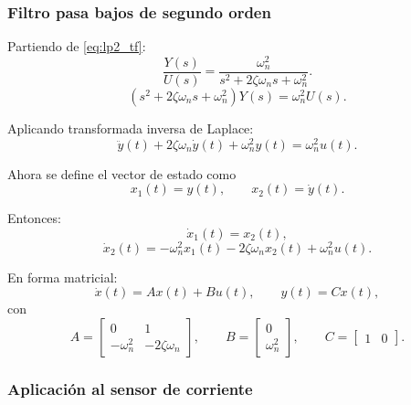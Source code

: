 \documentclass[12pt, a4paper,journal, onecolumn, compsoc]{IEEEtran}
\begin{document}
\subsubsection*{Filtro pasa bajos de segundo orden}

Partiendo de \eqref{eq:lp2_tf}:
\begin{equation}
    \frac{Y(s)}{U(s)}=\frac{\omega_n^2}{s^2+2\zeta\omega_n s+\omega_n^2}.
\end{equation}
\begin{equation}
    (s^2+2\zeta\omega_n s+\omega_n^2)Y(s)=\omega_n^2 U(s).
\end{equation}

Aplicando transformada inversa de Laplace:
\begin{equation}
    \ddot{y}(t)+2\zeta\omega_n \dot{y}(t)+\omega_n^2 y(t)=\omega_n^2 u(t).
\end{equation}

Ahora se define el vector de estado como
\begin{equation}
    x_1(t)=y(t), \qquad x_2(t)=\dot{y}(t).
\end{equation}

Entonces:
\begin{equation}
    \dot{x}_1(t)=x_2(t),
\end{equation}
\begin{equation}
    \dot{x}_2(t)= -\omega_n^2 x_1(t)-2\zeta\omega_n x_2(t)+\omega_n^2 u(t).
\end{equation}

En forma matricial:
\begin{equation}
    \dot{x}(t)=Ax(t)+Bu(t), \qquad y(t)=Cx(t),
\end{equation}
con
\begin{equation}
    A=
    \begin{bmatrix}
        0 & 1 \\
        -\omega_n^2 & -2\zeta\omega_n
    \end{bmatrix},
    \qquad
    B=
    \begin{bmatrix}
        0 \\
        \omega_n^2
    \end{bmatrix},
    \qquad
    C=
    \begin{bmatrix}
        1 & 0
    \end{bmatrix}.
\end{equation}

\subsubsection*{Aplicación al sensor de corriente}
\end{document}
